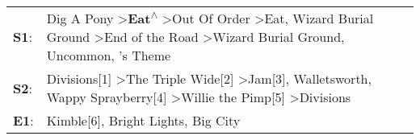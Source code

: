 \begin{supertabular}{p{0.03\textwidth}p{0.92\textwidth}}
 \textbf{S1}:  &  Dig A Pony\textsuperscript{} \textgreater \enspace \textbf{Eat\textsuperscript{$\wedge$}} \textgreater \enspace Out Of Order\textsuperscript{} \textgreater \enspace Eat\textsuperscript{}, \enspace Wizard Burial Ground\textsuperscript{} \textgreater \enspace End of the Road\textsuperscript{} \textgreater \enspace Wizard Burial Ground\textsuperscript{}, \enspace Uncommon\textsuperscript{}, 's Theme\textsuperscript{}  \enspace  \\
 \textbf{S2}:  &                                                                                                Divisions[1]\textsuperscript{} \textgreater \enspace The Triple Wide[2]\textsuperscript{} \textgreater \enspace Jam[3]\textsuperscript{}, \enspace Walletsworth\textsuperscript{}, \enspace Wappy Sprayberry[4]\textsuperscript{} \textgreater \enspace Willie the Pimp[5]\textsuperscript{} \textgreater \enspace Divisions\textsuperscript{}  \enspace  \\
 \textbf{E1}:  &                                                                                                                                                                                                                                                                                                                                                               Kimble[6]\textsuperscript{}, \enspace Bright Lights, Big City\textsuperscript{}  \enspace  \\
\end{supertabular}
